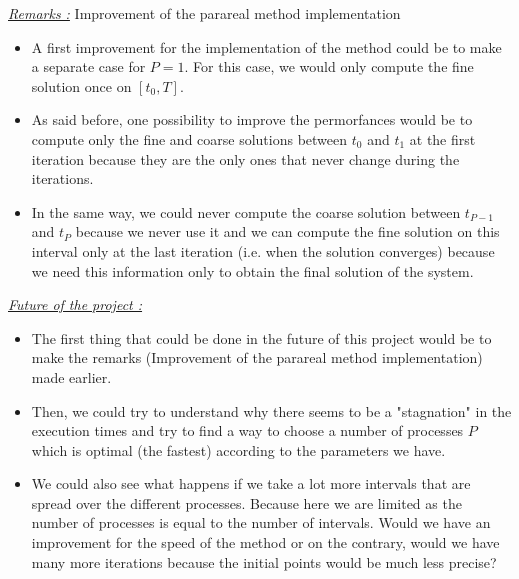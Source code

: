 \noindent \underline{\textit{Remarks :}} Improvement of the parareal method implementation 

\begin{itemize}[label=-]
	\item A first improvement for the implementation of the method could be to make a separate case for $P=1$. For this case, we would only compute the fine solution once on $[t_0,T]$.
	\item As said before, one possibility to improve the permorfances would be to compute only the fine and coarse solutions between $t_0$ and $t_1$ at the first iteration because they are the only ones that never change during the iterations. 
	\item In the same way, we could never compute the coarse solution between $t_{P-1}$ and $t_P$ because we never use it and we can compute the fine solution on this interval only at the last iteration (i.e. when the solution converges) because we need this information only to obtain the final solution of the system.
\end{itemize}

\noindent \underline{\textit{Future of the project :}}

\begin{itemize}[label=-]
	\item The first thing that could be done in the future of this project would be to make the remarks (Improvement of the parareal method implementation) made earlier.
	\item Then, we could try to understand why there seems to be a "stagnation" in the execution times and try to find a way to choose a number of processes $P$ which is optimal (the fastest) according to the parameters we have.
	\item We could also see what happens if we take a lot more intervals that are spread over the different processes. Because here we are limited as the number of processes is equal to the number of intervals. Would we have an improvement for the speed of the method or on the contrary, would we have many more iterations because the initial points would be much less precise?
\end{itemize}
